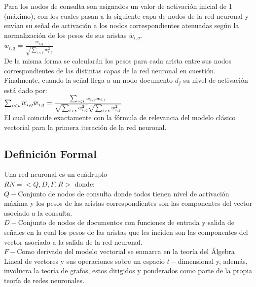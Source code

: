 \documentclass{llncs}
\begin{document}
{Para los nodos de consulta son asignados un valor de activaci\'on inicial de 1 (m\'aximo), con los cuales pasan a la siguiente capa de nodos de la red neuronal y env\'ian
su se\~nal de activaci\'on a los nodos correspondientes atenuadas seg\'un la normalizaci\'on de los pesos de sus aristas $\overline{w}_{i,q}$.\\

$\overline{w}_{i, q}$ = $\frac{w_{i, q}}{\sqrt{\sum_{i < t}{w^2_{i, q}}}}$ \\

De la misma forma se calcular\'an los pesos para cada arista entre sus nodos correspondien\-tes de las distintas capas de la red neuronal en cuesti\'on. Finalmente,
cuando la se\~nal llega a un nodo documento $d_j$ su nivel de activaci\'on est\'a dado por: \\

$\sum_{i < t}{\overline{w}_{i, q}\overline{w}_{i, j}} = \frac{\sum_{i < t}{w_{i,q}w_{i,j}}}{\sqrt{\sum_{i < t}{w^2_{i, q}}} \* \sqrt{\sum_{i < t}{w^2_{i, j}}}}$ \\

El cual coincide exactamente con la f\'ormula de relevancia del modelo cl\'asico vectorial para la primera iteraci\'on de la red neuronal.\\

\subsection{Definici\'on Formal}

Una red neuronal es un cu\'adruplo \\$RN = <Q, D, F, R>$ donde: \\

$Q - $Conjunto de nodos de consulta donde todos tienen nivel de activaci\'on m\'axima y los pesos de las aristas correspondientes son las componentes del vector
asociado a la consulta.\\

$D - $Conjunto de nodos de documentos con funciones de entrada y salida de se\~nales en la cual los pesos de las aristas que les inciden son las componentes del
vector asociado a la salida de la red neuronal.\\

$F - $Como derivado del modelo vectorial se enmarca en la teor\'ia del \'Algebra Lineal de vectores y sus operaciones sobre un espacio $t-$dimensional y, adem\'as,
involucra la teor\'ia de grafos, estos dirigidos y ponderados como parte de la propia teor\'ia de redes neuronales.\\

}
\end{document}
